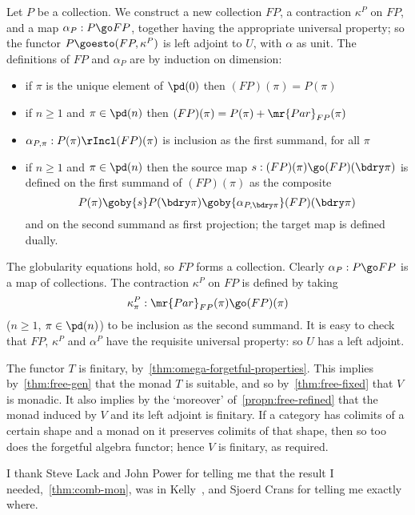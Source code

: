 Let $P$ be a collection.  We construct a new collection $FP$, a contraction
$\kappa^P$ on $FP$, and a map $\alpha_P: P \go FP$, together having the
appropriate universal property; so the functor $P \goesto (FP, \kappa^P)$
is left adjoint to $U$, with $\alpha$ as unit.  The definitions of $FP$ and
$\alpha_P$ are by induction on dimension:
% 
\begin{itemize}
\item if $\pi$ is the unique element of $\pd(0)$ then $(FP)(\pi) = P(\pi)$
\item if $n\geq 1$ and $\pi\in\pd(n)$ then
$
(FP)(\pi)
=
P(\pi) + 
\mr{Par}_{FP}(\pi)
$
\item $\alpha_{P,\pi}: P(\pi) \rIncl (FP)(\pi)$ is inclusion as the first
summand, for all $\pi$
\item if $n\geq 1$ and $\pi\in\pd(n)$ then the source map $s: (FP)(\pi) \go
(FP)(\bdry\pi)$ is defined on the first summand of $(FP)(\pi)$ as the
composite
\[
P(\pi) \goby{s} P(\bdry\pi) \goby{\alpha_{P,\bdry\pi}} (FP)(\bdry\pi)
\]
and on the second summand as first projection; the target map is defined
dually.
\end{itemize}
%
The globularity equations hold, so $FP$ forms a collection.  Clearly
$\alpha_P: P \go FP$ is a map of collections.  The contraction $\kappa^P$
on $FP$ is defined by taking 
\[
\kappa^P_\pi: \mr{Par}_{FP}(\pi) \go (FP)(\pi)
\]
($n\geq 1$, $\pi\in\pd(n)$) to be inclusion as the second summand.  It is
easy to check that $FP$, $\kappa^P$ and $\alpha^P$ have the requisite
universal property: so $U$ has a left adjoint.



The functor $T$ is finitary, by~\ref{thm:omega-forgetful-properties}.  This
implies by~\ref{thm:free-gen} that the monad $T$ is suitable, and so
by~\ref{thm:free-fixed} that $V$ is monadic.  It also implies by the
`moreover' of~\ref{propn:free-refined} that the monad induced by $V$ and
its left adjoint is finitary.  If a category has colimits of a certain
shape and a monad on it preserves colimits of that shape, then so too does
the forgetful algebra functor; hence $V$ is finitary, as required.  

\begin{notes}

I thank Steve Lack and John Power for telling me that the result I
needed,~\ref{thm:comb-mon}, was in Kelly~\cite{KelUTT}, and Sjoerd Crans
for telling me exactly where.%
%
%




\end{notes}
